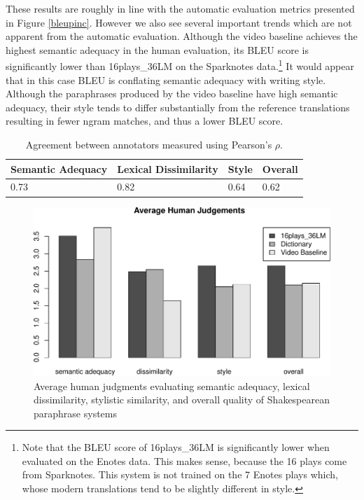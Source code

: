 \documentclass[10pt,a5paper,twoside]{article}
\begin{document}
These results are roughly in line with the automatic evaluation metrics presented in Figure \ref{bleupinc}.  However we also see several important
trends which are not apparent from the automatic evaluation.
Although the video baseline achieves the highest semantic adequacy in the human evaluation, its BLEU score
is significantly lower than 16plays\_36LM on the Sparknotes data.\footnote{
Note that the BLEU score of 16plays\_36LM is significantly lower when evaluated on the Enotes data.  This makes sense, because the 
16 plays come from Sparknotes. This system is not trained on the 7 Enotes plays which, whose modern translations tend
to be slightly different in style.}
It would appear that in this case BLEU is conflating semantic adequacy with writing style.  Although the paraphrases produced 
by the video baseline have high semantic adequacy, their style tends to differ substantially from the reference translations resulting
in fewer ngram matches, and thus a lower BLEU score.

\begin{table}
  \begin{center}
    \begin{tabular}{|l|l|l|l|}
      \hline
      Semantic Adequacy & Lexical Dissimilarity & Style & Overall \\
      \hline
      \hline
      0.73 & 0.82 & 0.64 & 0.62 \\
      \hline
    \end{tabular}
  \end{center}
  \caption{Agreement between annotators measured using Pearson's $\rho$.}
  \label{annotator_agreement}
\end{table}

\begin{figure}[ht]
  \begin{center}
    \includegraphics[width=5in]{figures/human_judgements-crop.pdf}
  \end{center}
  \caption{Average human judgments evaluating semantic adequacy, lexical dissimilarity, stylistic similarity, and overall quality
    of Shakespearean paraphrase systems} 
  \label{human_judgements}
\end{figure}
\end{document}
